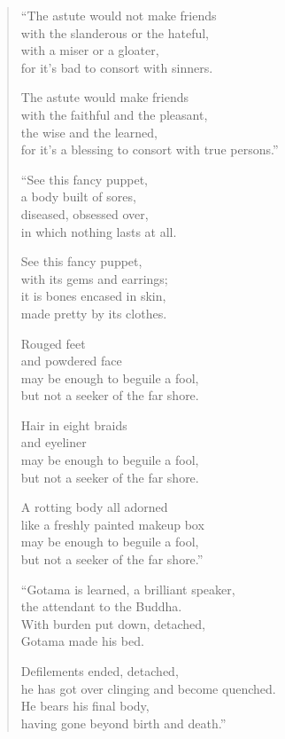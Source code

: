 \documentclass[12pt,openany]{book}%
\begin{document}
\begin{verse}%
“The astute would not make friends \\
with the slanderous or the hateful, \\
with a miser or a gloater, \\
for it’s bad to consort with sinners. 

The astute would make friends \\
with the faithful and the pleasant, \\
the wise and the learned, \\
for it’s a blessing to consort with true persons.” 

“See this fancy puppet, \\
a body built of sores, \\
diseased, obsessed over, \\
in which nothing lasts at all. 

See this fancy puppet, \\
with its gems and earrings; \\
it is bones encased in skin, \\
made pretty by its clothes. 

Rouged feet \\
and powdered face \\
may be enough to beguile a fool, \\
but not a seeker of the far shore. 

Hair in eight braids \\
and eyeliner \\
may be enough to beguile a fool, \\
but not a seeker of the far shore. 

A rotting body all adorned \\
like a freshly painted makeup box \\
may be enough to beguile a fool, \\
but not a seeker of the far shore.” 

“Gotama is learned, a brilliant speaker, \\
the attendant to the Buddha. \\
With burden put down, detached, \\
Gotama made his bed. 

Defilements ended, detached, \\
he has got over clinging and become quenched. \\
He bears his final body, \\
having gone beyond birth and death.” 


\end{verse}
\end{document}
